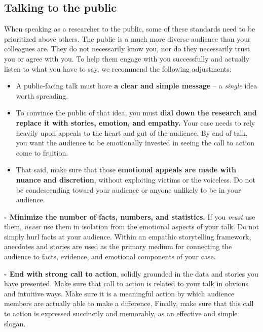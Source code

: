 \documentclass[
]{book}
\begin{document}
\hypertarget{talking-to-the-public}{%
\subsection*{Talking to the public}\label{talking-to-the-public}}

When speaking as a researcher to the public, some of these standards need to be prioritized above others. The public is a much more diverse audience than your colleagues are. They do not necessarily know you, nor do they necessarily trust you or agree with you. To help them engage with you successfully and actually listen to what you have to say, we recommend the following adjustments:

\begin{itemize}
\item
  A public-facing talk must have \textbf{a clear and simple message} -- a \emph{single} idea worth spreading.
\item
  To convince the public of that idea, you must \textbf{dial down the research and replace it with stories, emotion, and empathy.} Your case needs to rely heavily upon appeals to the heart and gut of the audience. By end of talk, you want the audience to be emotionally invested in seeing the call to action come to fruition.
\item
  That said, make sure that those \textbf{emotional appeals are made with nuance and discretion}, without exploiting victims or the voiceless. Do not be condescending toward your audience or anyone unlikely to be in your audience.
\end{itemize}

\textbf{- Minimize the number of facts, numbers, and statistics.} If you \emph{must} use them, \emph{never} use them in isolation from the emotional aspects of your talk. Do not simply hurl facts at your audience. Within an empathic storytelling framework, anecdotes and stories are used as the primary medium for connecting the
audience to facts, evidence, and emotional components of your case.

\textbf{- End with strong call to action}, solidly grounded in the data and stories you have presented. Make sure that call to action is related to your talk in obvious and intuitive ways. Make sure it is a meaningful action by which audience members are actually able to make a difference. Finally, make sure that this call to action is expressed succinctly and memorably, as an effective and simple slogan.
\end{document}
